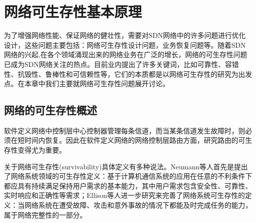 
\chapter{网络可生存性基本原理}
为了增强网络性能、保证网络的健壮性，需要对SDN网络中的许多问题进行优化设计，这些问题主要包括：网络可生存性设计问题，业务恢复问题等。随着SDN 网络的兴起,在各个领域涌现出来的网络业务在广泛的增长，网络的可生存性问题已成为SDN网络关注的热点。目前业内提出了许多关键词，比如可靠性、容错性、抗毁性、鲁棒性和可信赖性等，它们的本质都是以网络可生存性的研究为出发点。在本章中我们主要就网络可生存性问题展开讨论。



\section{网络的可生存性概述}
软件定义网络中控制层中心控制器管理每条信道，而当某条信道发生故障时，则必须在短时间内恢复。因此在软件定义网络的网络控制层路由方面，研究路由的可生存性变得尤为重要。

关于网络可生存性(survivability)具体定义有多种说法\cite{al2009comparative}。Neumann\cite{hollway1993survivable}等人首先是提出了网络系统领域的可生存性定义：基于计算机通信系统的应用在任意的不利条件下都应具有持续满足保持用户需求的基本能力，其中用户需求包含安全性、可靠性、实时响应和正确性等需求；Ellison\cite{ellison1997survivable}等人进一步研究来完善了网络系统可生存性的定义：当网络系统在遭受故障、攻击和意外事故的情况下都能及时完成任务的能力，属于网络完整性的一部分。






